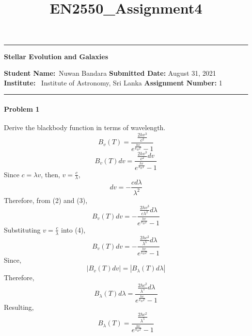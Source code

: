 \documentclass[11pt]{scrartcl}
\title{EN2550_Assignment4}
\begin{document}
\begin{center}
	\hrule
	\vspace{.4cm}
	{\textbf { \large Stellar Evolution and Galaxies}}
\end{center}
{\textbf{Student Name:}\ Nuwan Bandara \hspace{\fill} \textbf{Submitted Date:} August 31, 2021   \\
{ \textbf{Institute:}} \ Institute of Astronomy, Sri Lanka \hspace{\fill} \textbf{Assignment Number:} 1 \\
	\hrule

\bigskip

\paragraph*{Problem 1} %
Derive the blackbody function in terms of wavelength.
\newline
\begin{equation}
    B_v(T) = \frac{\frac{2hv^3}{c^2}}{e^{\frac{hv}{k_BT}}-1}
\end{equation}
\begin{equation}
    B_v(T)dv = \frac{\frac{2hv^3}{c^2}dv}{e^{\frac{hv}{k_BT}}-1}
\end{equation}
Since $c=\lambda v$, then, $v=\frac{c}{\lambda}$,
\begin{equation}
    dv = -\frac{cd\lambda}{\lambda^2}
\end{equation}
Therefore, from (2) and (3),
\begin{equation}
    B_v(T)dv = -\frac{\frac{2hv^3}{c\lambda^2}d\lambda}{e^{\frac{hv}{k_BT}}-1}
\end{equation}
Substituting $v=\frac{c}{\lambda}$ into (4),
\begin{equation}
    B_v(T)dv = -\frac{\frac{2hc^2}{\lambda^5}d\lambda}{e^{\frac{hv}{k_BT}}-1}
\end{equation}
Since,
\begin{equation}
    |B_v(T)dv| = |B_\lambda(T)d\lambda|
\end{equation}
Therefore,
\begin{equation}
    B_\lambda(T)d\lambda = \frac{\frac{2hc^2}{\lambda^5}d\lambda}{e^{\frac{hv}{k_BT}}-1}
\end{equation}
Resulting,
\begin{equation}
    B_\lambda(T) = \frac{\frac{2hc^2}{\lambda^5}}{e^{\frac{hv}{k_BT}}-1}
\end{equation}

}
\end{document}
